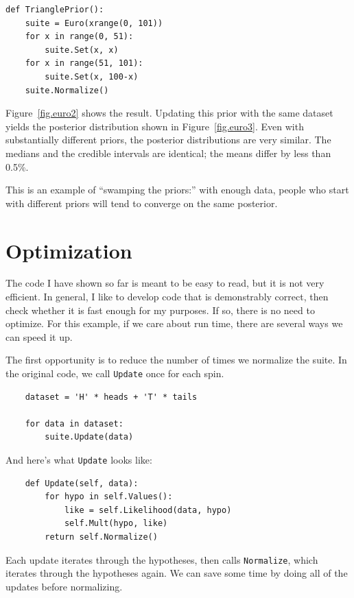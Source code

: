 \documentclass[12pt]{book}
\begin{document}
\begin{verbatim}
def TrianglePrior():
    suite = Euro(xrange(0, 101))
    for x in range(0, 51):
        suite.Set(x, x)
    for x in range(51, 101):
        suite.Set(x, 100-x) 
    suite.Normalize()
\end{verbatim}

Figure~\ref{fig.euro2} shows the result.  Updating this prior
with the same dataset yields the posterior distribution shown
in Figure~\ref{fig.euro3}.  Even with substantially different
priors, the posterior distributions are very similar.  The medians
and the credible intervals are identical; the means differ by
less than 0.5\%.

This is an example of ``swamping the priors:'' with enough
data, people who start with different priors will tend to
converge on the same posterior.


\section{Optimization}

The code I have shown so far is meant to be easy to read, but it
is not very efficient.  In general, I like to develop code that
is demonstrably correct, then check whether it is fast enough for
my purposes.  If so, there is no need to optimize.
For this example, if we care about run time,
there are several ways we can speed it up.

The first opportunity is to reduce the number of times we
normalize the suite.
In the original code, we call \verb"Update" once for each spin.

\begin{verbatim}
    dataset = 'H' * heads + 'T' * tails

    for data in dataset:
        suite.Update(data)
\end{verbatim}

And here's what \verb"Update" looks like:

\begin{verbatim}
    def Update(self, data):
        for hypo in self.Values():
            like = self.Likelihood(data, hypo)
            self.Mult(hypo, like)
        return self.Normalize()
\end{verbatim}

Each update iterates through the hypotheses, then calls \verb"Normalize",
which iterates through the hypotheses again.  We can save some
time by doing all of the updates before normalizing.
\end{document}
